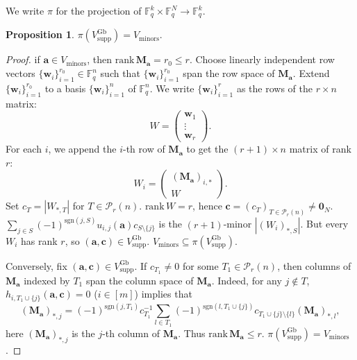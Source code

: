 \documentclass[a4paper, 11pt]{amsart}
\newcommand{\mc}[1]{\mathcal{#1}}
\newcommand{\ssm}[1]{\sum_{#1}}
\newcommand{\td}[1]{\bm{#1}}
\newcommand{\tx}[1]{\text{#1}}
\newcommand{\fq}{\mathbb{F}_q}
\theoremstyle{definition}
\newtheorem{proposition}[theorem]{Proposition}
\theoremstyle{definition}
\begin{document}
	We write $\pi$ for the projection of $\fq^k\times\fq^N\to\fq^k$.
	\begin{proposition}\label{pro:Vsup and Vmin}
		$\pi(V^{\tx{Gb}}_{\tx{supp}})=V_{\tx{minors}}$.
	\end{proposition}
	
	\begin{proof}
		if $\td{a}\in V_{\tx{minors}}$, then $\tx{rank}\,\td{M_a}=r_0\leq r$. Choose linearly independent row vectors $\{\td{w}_i\}_{i=1}^{r_0}\in\fq^n$ such that $\{\td{w}_i\}_{i=1}^{r_0}$ span the row space of $\td{M_a}$. Extend $\{\td{w}_i\}_{i=1}^{r_0}$ to a basis $\{\td{w}_i\}_{i=1}^n$ of $\fq^n$. We write $\{\td{w}_i\}_{i=1}^r$ as the rows of the $r\times n$ matrix:
		\begin{equation*}
			W=\begin{pmatrix}
				\td{w}_1\\
				\vdots\\
				\td{w}_r
			\end{pmatrix}.
		\end{equation*}
		For each $i$, we append the $i$-th row of $\td{M_a}$ to get the $(r+1)\times n$ matrix of rank $r$: 
		\begin{equation*}
			W_i=\begin{pmatrix}
				(\td{M_a})_{i,*}\\
				W
			\end{pmatrix}.
		\end{equation*}
		Set $c_T=|W_{*,T}|$ for $T\in\mc{P}_r(n)$. $\tx{rank}\,W=r$, hence $\td{c}=(c_T)_{T\in\mc{P}_r(n)}\neq\td{0}_N$. $\ssm{j\in S}(-1)^{\tx{sgn}(j,S)}u_{i,j}(\td{a})c_{S\setminus\{j\}}$ is the $(r+1)$-minor $|(W_i)_{*,S}|$. But every $W_i$ has rank $r$, so $(\td{a},\td{c})\in V^{\tx{Gb}}_{\tx{supp}}$. $V_{\tx{minors}}\subseteq\pi(V^{\tx{Gb}}_{\tx{supp}})$.
		
		Conversely, fix $(\td{a},\td{c})\in V^{\tx{Gb}}_{\tx{supp}}$. If $c_{T_1}\neq 0$ for some $T_1\in\mc{P}_r(n)$, then columns of $\td{M_a}$ indexed by $T_1$ span the column space of $\td{M_a}$. Indeed, for any $j\notin T$, $h_{i,T_1\cup\{j\}}(\td{a},\td{c})=0$ ($i\in[m]$) implies that
		\begin{equation*}
			(\td{M_a})_{*,j}=(-1)^{\tx{sgn}(j,T_1)}c_{T_1}^{-1}\ssm{l\in T_1}(-1)^{\tx{sgn}(l,T_1\cup\{j\})}c_{T_1\cup\{j\}\setminus\{l\}}(\td{M_a})_{*,l},
		\end{equation*}
		here $(\td{M_a})_{*,j}$ is the $j$-th column of $\td{M_a}$. Thus $\tx{rank}\,\td{M_a}\leq r$. $\pi(V^{\tx{Gb}}_{\tx{supp}})=V_{\tx{minors}}$. 
	\end{proof}
	
\end{document}
